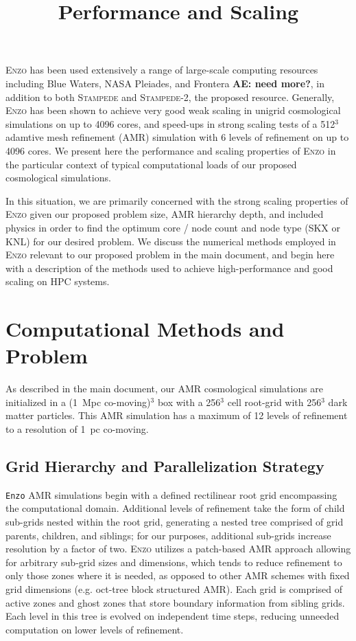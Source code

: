 \documentclass[12pt]{article} %
\title{\vspace{-5ex} Performance and Scaling
       \vspace{-2ex}}
\begin{document}
 \thispagestyle{empty}


\maketitle

\textsc{Enzo} has been used extensively a range of large-scale computing resources including Blue Waters, NASA Pleiades, and Frontera \textbf{AE: need more?}, in addition to both \textsc{Stampede} and \textsc{Stampede-2}, the proposed resource. Generally, \textsc{Enzo} has been shown to achieve very good weak scaling in unigrid cosmological simulations on up to 4096 cores, and speed-ups in strong scaling tests of a 512$^3$ adamtive mesh refinement (AMR) simulation with 6 levels of refinement on up to 4096 cores. We present here the performance and scaling properties of \textsc{Enzo} in the particular context of typical computational loads of our proposed cosmological simulations.

In this situation, we are primarily concerned with the strong scaling properties of \textsc{Enzo} given our proposed problem size, AMR hierarchy depth, and included physics in order to find the optimum core / node count and node type (SKX or KNL) for our desired problem. We discuss the numerical methods employed in \textsc{Enzo} relevant to our proposed problem in the main document, and begin here with a description of the methods used to achieve high-performance and good scaling on HPC systems. 

\section{Computational Methods and Problem}

As described in the main document, our AMR cosmological simulations are initialized in a (1~Mpc co-moving)$^3$ box with a 256$^3$ cell root-grid with 256$^3$ dark matter particles. This AMR simulation has a maximum of 12 levels of refinement to a resolution of 1~pc co-moving. 

\subsection{Grid Hierarchy and Parallelization Strategy}

\texttt{Enzo} AMR simulations begin with a defined rectilinear root grid encompassing the computational domain. Additional levels of refinement take the form of child sub-grids nested within the root grid, generating a nested tree comprised of grid parents, children, and siblings; for our purposes, additional sub-grids increase resolution by a factor of two. \textsc{Enzo} utilizes a patch-based AMR approach allowing for arbitrary sub-grid sizes and dimensions, which tends to reduce refinement to only those zones where it is needed, as opposed to other AMR schemes with fixed grid dimensions (e.g. oct-tree block structured AMR). Each grid is comprised of active zones and ghost zones that store boundary information from sibling grids. Each level in this tree is evolved on independent time steps, reducing unneeded computation on lower levels of refinement.
\end{document}
